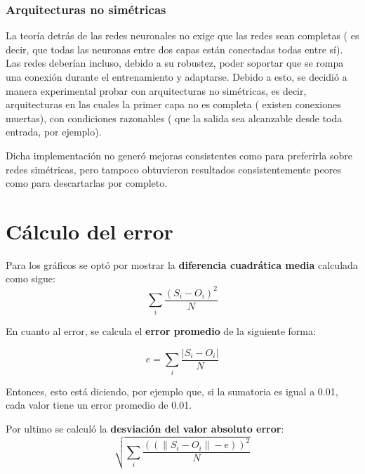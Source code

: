 \documentclass[%
    final,
    reprint,
    notitlepage,
    narroweqnarray,
    inline,
    twoside,
    invited
    ]{ieee}
\begin{document}
\subsubsection{Arquitecturas no simétricas}

\par La teoría detrás de las redes neuronales no exige que las redes sean completas ( es decir, que todas 
las neuronas entre dos capas están conectadas todas entre sí). Las redes deberían incluso, debido a su robustez, poder soportar 
que se rompa una conexión durante el entrenamiento y adaptarse. Debido a esto, 
se decidió a manera experimental probar con arquitecturas no simétricas, 
es decir, arquitecturas en las cuales la primer capa no es completa ( existen conexiones muertas), con condiciones razonables ( que la salida sea 
alcanzable desde toda entrada, por ejemplo). 
\par Dicha implementación no generó mejoras consistentes como para preferirla sobre redes simétricas, pero tampoco 
obtuvieron resultados consistentemente peores como para descartarlas por completo.

\section{Cálculo del error}

\par Para los gráficos se optó por mostrar la \textbf{diferencia cuadrática media} calculada como sigue:\\

\begin{equation}
\sum\limits_{i}\frac{(S_i - O_i)^{2}}{N}
\end{equation}

\par En cuanto al error, se calcula el \textbf{error promedio} de la siguiente forma:

\begin{equation}
e = \sum\limits_{i}\frac{|S_i - O_i|}{N}
\end{equation}


Entonces, esto está diciendo, por ejemplo que, si la sumatoria es igual a 0.01, cada valor tiene un error promedio de 0.01.

\par Por ultimo se calculó la \textbf{desviación del valor absoluto error}:\\

\begin{equation}
\sqrt{\sum\limits_{i}\frac{((\|S_i - O_i\| - e))^2}{N}}
\end{equation}
\end{document}
